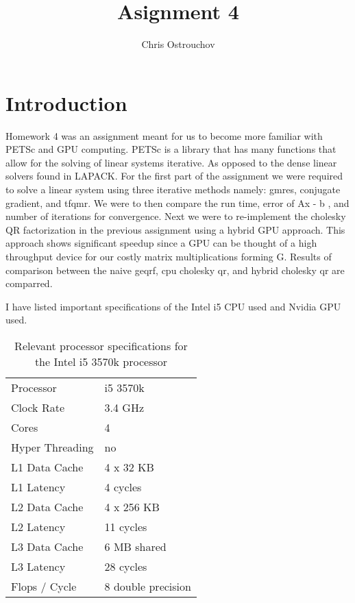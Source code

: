 \documentclass{article}[11pt]
\author{Chris Ostrouchov}
\title{Asignment 4}
\date{}
\begin{document}
\maketitle

\section{Introduction}

Homework 4 was an assignment meant for us to become more familiar with PETSc and GPU computing. PETSc is a library that has many functions that allow for the solving of linear systems iterative. As opposed to the dense linear solvers found in LAPACK. For the first part of the assignment we were required to solve a linear system using three iterative methods namely: gmres, conjugate gradient, and tfqmr. We were to then compare the run time, error of Ax - b , and number of iterations for convergence. Next we were to re-implement the cholesky QR factorization in the previous assignment using a hybrid GPU approach. This approach shows significant speedup since a GPU can be thought of a high throughput device for our costly matrix multiplications forming G. Results of comparison between the naive geqrf, cpu cholesky qr, and hybrid cholesky qr are comparred.

I have listed important specifications of the Intel i5 CPU used and Nvidia GPU used.

\begin{table}[!ht]
  \centering
  \caption{Relevant processor specifications for the Intel i5 3570k processor}
  \label{tab:i5_3570k}

  \vspace{3mm}
  \begin{tabular}{ l | l } 
    Processor & i5 3570k \\
    Clock Rate & 3.4 GHz \\
    Cores & 4 \\
    Hyper Threading & no \\
    L1 Data Cache & 4 x 32 KB \\
    L1 Latency & 4 cycles \\
    L2 Data Cache & 4 x 256 KB \\
    L2 Latency & 11 cycles \\
    L3 Data Cache & 6 MB shared \\
    L3 Latency & 28 cycles \\
    Flops / Cycle & 8 double precision
  \end{tabular}
\end{table}
\end{document}
